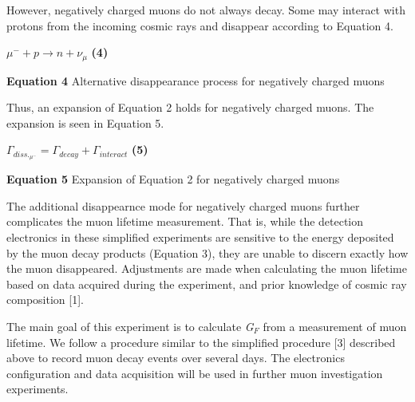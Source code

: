 \documentclass{article}
\begin{document}
However, negatively charged muons do not always decay. Some may interact with protons from the incoming cosmic rays and disappear according to Equation 4. 

\begin{center}
    
    $\mu^{-} + \textit{p} \rightarrow \textit{n} +  \nu_{\mu}$ \hspace{10mm} \textbf{(4)}
    
    \vspace{5mm}
    
    \textbf{Equation 4} Alternative disappearance process for negatively charged muons 
    
\end{center}

Thus, an expansion of Equation 2 holds for negatively charged muons. The expansion is seen in Equation 5. 
\begin{center}
    
    $\Gamma_{diss._{\mu^{-}}} = \Gamma_{decay} + \Gamma_{interact}$ \hspace{10mm} \textbf{(5)}
    
    \vspace{5mm}
    
    \textbf{Equation 5} Expansion of Equation 2 for negatively charged muons
    
\end{center}

The additional disappearnce mode for negatively charged muons further complicates the muon lifetime measurement. That is, while the detection electronics in these simplified experiments are sensitive to the energy deposited by the muon decay products (Equation 3), they are unable to discern exactly how the muon disappeared. Adjustments are made when calculating the muon lifetime based on data acquired during the experiment, and prior knowledge of cosmic ray composition [1]. %

The main goal of this experiment is to calculate \textit{G$_{F}$} from a measurement of muon lifetime. We follow a procedure similar to the simplified procedure [3] %
described above to record muon decay events over several days. The electronics configuration and data acquisition will be used in further muon investigation experiments. 
 

 
\end{document}
